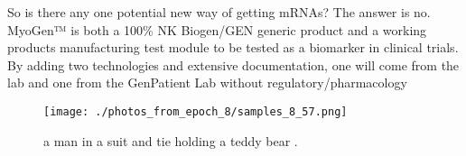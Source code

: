 \documentclass{article}%
\begin{document}
So is there any one potential new way of getting mRNAs?\newline%
The answer is no. MyoGen™ is both a 100\% NK Biogen/GEN generic product and a working products manufacturing test module to be tested as a biomarker in clinical trials. By adding two technologies and extensive documentation, one will come from the lab and one from the GenPatient Lab without regulatory/pharmacology

%


\begin{figure}[h!]%
\centering%
\texttt{[image: ./photos\_from\_epoch\_8/samples\_8\_57.png]}%
\caption{a man in a suit and tie holding a teddy bear .}%
\end{figure}

%
\end{document}
